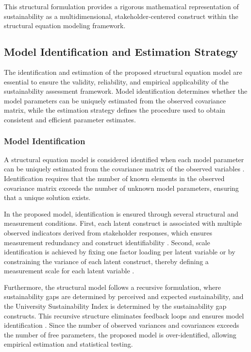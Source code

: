 \documentclass[11pt,a4paper]{article}
\begin{document}
This structural formulation provides a rigorous mathematical representation of sustainability as a multidimensional, stakeholder-centered construct within the structural equation modeling framework.



\subsection{Model Identification and Estimation Strategy}

The identification and estimation of the proposed structural equation model are essential to ensure the validity, reliability, and empirical applicability of the sustainability assessment framework. Model identification determines whether the model parameters can be uniquely estimated from the observed covariance matrix, while the estimation strategy defines the procedure used to obtain consistent and efficient parameter estimates.

\subsubsection{Model Identification}

A structural equation model is considered identified when each model parameter can be uniquely estimated from the covariance matrix of the observed variables \cite{Bollen1989,Kline2016}. Identification requires that the number of known elements in the observed covariance matrix exceeds the number of unknown model parameters, ensuring that a unique solution exists.

In the proposed model, identification is ensured through several structural and measurement conditions. First, each latent construct is associated with multiple observed indicators derived from stakeholder responses, which ensures measurement redundancy and construct identifiability \cite{Hair2022}. Second, scale identification is achieved by fixing one factor loading per latent variable or by constraining the variance of each latent construct, thereby defining a measurement scale for each latent variable \cite{Byrne2016}.

Furthermore, the structural model follows a recursive formulation, where sustainability gaps are determined by perceived and expected sustainability, and the University Sustainability Index is determined by the sustainability gap constructs. This recursive structure eliminates feedback loops and ensures model identification \cite{Kline2016}. Since the number of observed variances and covariances exceeds the number of free parameters, the proposed model is over-identified, allowing empirical estimation and statistical testing.
\end{document}
